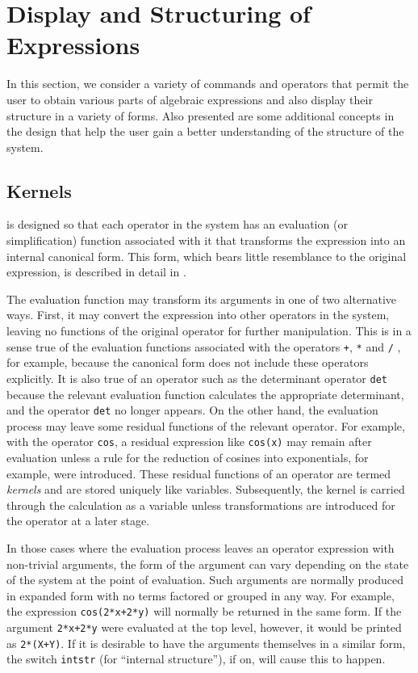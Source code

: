 \chapter{Display and Structuring of Expressions}
In this section, we consider a variety of commands and operators that
permit the user to obtain various parts of algebraic expressions and also
display their structure in a variety of forms. Also presented are some
additional concepts in the {\REDUCE} design that help the user gain a better
understanding of the structure of the system.

\section{Kernels}
{\REDUCE} is designed so that each operator in the system has an
evaluation (or simplification) function associated
with it that transforms the expression into an internal canonical form.
  This form, which bears little resemblance to the
original expression, is described in detail in \cite{Hearn:71a}.

The evaluation function may transform its arguments in one of two
alternative ways.  First, it may convert the expression into other
operators in the system, leaving no functions of the original operator for
further manipulation.  This is in a sense true of the evaluation functions
associated with the operators \texttt{+}, \texttt{*} and \texttt{/} , for example,
because the canonical form does not include these
operators explicitly.  It is also true of an operator such as the
determinant operator \texttt{det} because the relevant
evaluation function calculates the appropriate determinant, and the
operator \texttt{det} no longer appears.  On the other hand, the evaluation
process may leave some residual functions of the relevant operator.  For
example, with the operator \texttt{cos}, a residual expression like
\texttt{cos(x)} may remain after evaluation unless a rule for the reduction of
cosines into exponentials, for example, were introduced.  These residual
functions of an operator are termed \emph{kernels} and are
stored uniquely like variables.  Subsequently, the kernel is carried
through the calculation as a variable unless transformations are
introduced for the operator at a later stage.

\hypertarget{switch:INTSTR}{}
In those cases where the evaluation process leaves an operator expression
with non-trivial arguments, the form of the argument can vary depending on
the state of the system at the point of evaluation.  Such arguments are
normally produced in expanded form with no terms factored or grouped in
any way.  For example, the expression \texttt{cos(2*x+2*y)} will normally be
returned in the same form.  If the argument \texttt{2*x+2*y} were evaluated
at the top level, however, it would be printed as \texttt{2*(X+Y)}.  If it is
desirable to have the arguments themselves in a similar form, the switch
\texttt{intstr} (for ``internal structure''), if on, will
cause this to happen.


